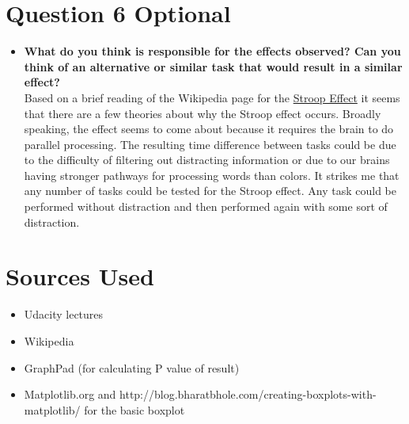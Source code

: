 \documentclass[a4paper,11pt]{report}
\begin{document}
\section{Question 6 Optional}
  \begin{itemize}
    \item \textbf{What do you think is responsible for the effects observed?  Can you think of an alternative or similar task that would result in a similar effect?}\\
    Based on a brief reading of the Wikipedia page for the \href{https://en.wikipedia.org/wiki/Stroop_effect}{Stroop Effect} it seems that there are a few theories about why the Stroop effect occurs.  Broadly speaking, the effect seems to come about because it requires the brain to do parallel processing.  The resulting time difference between tasks could be due to the difficulty of filtering out distracting information or due to our brains having stronger pathways for processing words than colors.  It strikes me that any number of tasks could be tested for the Stroop effect.  Any task could be performed without distraction and then performed again with some sort of distraction.
  
  \end{itemize}
  
\section{Sources Used}
  \begin{itemize}
    \item Udacity lectures
    \item Wikipedia
    \item GraphPad (for calculating P value of result)
    \item Matplotlib.org and http://blog.bharatbhole.com/creating-boxplots-with-matplotlib/ for the basic boxplot
  \end{itemize}
\end{document}
